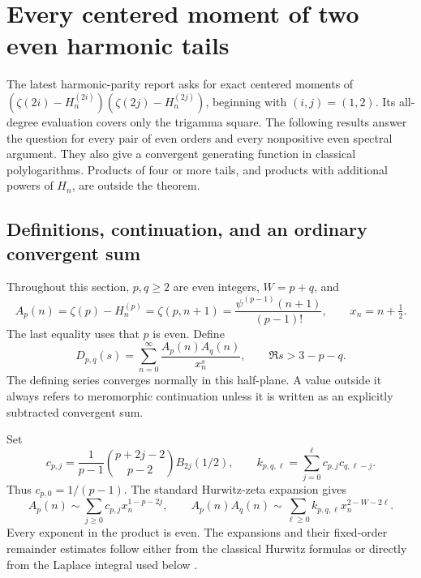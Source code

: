 \section{Every centered moment of two even harmonic tails}
\label{tail:section}

The latest harmonic-parity report asks for exact centered moments of
\((\zeta(2i)-H_n^{(2i)})(\zeta(2j)-H_n^{(2j)})\), beginning with
\((i,j)=(1,2)\). Its all-degree evaluation covers only the trigamma
square. The following results answer the question for every pair of
even orders and every nonpositive even spectral argument. They also
give a convergent generating function in classical polylogarithms.
Products of four or more tails, and products with additional powers
of \(H_n\), are outside the theorem.

\subsection{Definitions, continuation, and an ordinary convergent sum}

Throughout this section, \(p,q\ge2\) are even integers, \(W=p+q\), and
\[
 A_p(n)=\zeta(p)-H_n^{(p)}=\zeta(p,n+1)
       =\frac{\psi^{(p-1)}(n+1)}{(p-1)!},
 \qquad x_n=n+\tfrac12.
\]
The last equality uses that \(p\) is even. Define
\begin{equation}\label{tail:D}
 D_{p,q}(s)=\sum_{n=0}^{\infty}\frac{A_p(n)A_q(n)}{x_n^s},
 \qquad \Re s>3-p-q.
\end{equation}
The defining series converges normally in this half-plane. A value
outside it always refers to meromorphic continuation unless it is
written as an explicitly subtracted convergent sum.

Set
\begin{equation}\label{tail:asymptotic-coefficients}
 c_{p,j}=\frac1{p-1}\binom{p+2j-2}{p-2}B_{2j}(1/2),
 \qquad
 k_{p,q,\ell}=\sum_{j=0}^{\ell}c_{p,j}c_{q,\ell-j}.
\end{equation}
Thus \(c_{p,0}=1/(p-1)\). The standard Hurwitz-zeta expansion gives
\begin{equation}\label{tail:centered-expansion}
 A_p(n)\sim\sum_{j\ge0}c_{p,j}x_n^{1-p-2j},
 \qquad
 A_p(n)A_q(n)\sim\sum_{\ell\ge0}
                  k_{p,q,\ell}x_n^{2-W-2\ell}.
\end{equation}
Every exponent in the product is even. The expansions and their
fixed-order remainder estimates follow either from the classical
Hurwitz formulas or directly from the Laplace integral used below
\cite{DLMF}.

